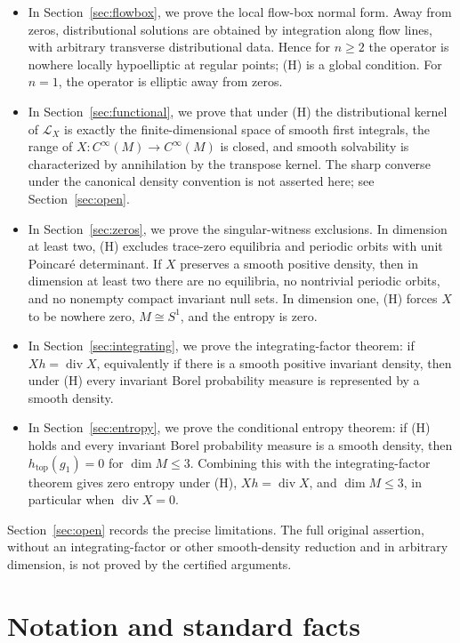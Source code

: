 \documentclass[12pt]{article}
\theoremstyle{definition}
\DeclareMathOperator{\Div}{div}
\begin{document}
\begin{itemize}
\item In Section~\ref{sec:flowbox}, we prove the local flow-box normal form.  Away from zeros, distributional solutions are obtained by integration along flow lines, with arbitrary transverse distributional data.  Hence for \(n\ge 2\) the operator is nowhere locally hypoelliptic at regular points; (H) is a global condition.  For \(n=1\), the operator is elliptic away from zeros.
\item In Section~\ref{sec:functional}, we prove that under (H) the distributional kernel of \(\mathcal L_X\) is exactly the finite-dimensional space of smooth first integrals, the range of \(X:C^\infty(M)\to C^\infty(M)\) is closed, and smooth solvability is characterized by annihilation by the transpose kernel.  The sharp converse under the canonical density convention is not asserted here; see Section~\ref{sec:open}.
\item In Section~\ref{sec:zeros}, we prove the singular-witness exclusions.  In dimension at least two, (H) excludes trace-zero equilibria and periodic orbits with unit Poincar\'e determinant.  If \(X\) preserves a smooth positive density, then in dimension at least two there are no equilibria, no nontrivial periodic orbits, and no nonempty compact invariant null sets.  In dimension one, (H) forces \(X\) to be nowhere zero, \(M\cong S^1\), and the entropy is zero.
\item In Section~\ref{sec:integrating}, we prove the integrating-factor theorem: if \(Xh=\Div X\), equivalently if there is a smooth positive invariant density, then under (H) every invariant Borel probability measure is represented by a smooth density.
\item In Section~\ref{sec:entropy}, we prove the conditional entropy theorem: if (H) holds and every invariant Borel probability measure is a smooth density, then \(h_{\mathrm{top}}(g_1)=0\) for \(\dim M\le 3\).  Combining this with the integrating-factor theorem gives zero entropy under (H), \(Xh=\Div X\), and \(\dim M\le 3\), in particular when \(\Div X=0\).
\end{itemize}

Section~\ref{sec:open} records the precise limitations.  The full original assertion, without an integrating-factor or other smooth-density reduction and in arbitrary dimension, is not proved by the certified arguments.

\section{Notation and standard facts}
\label{sec:prelim}
\end{document}
